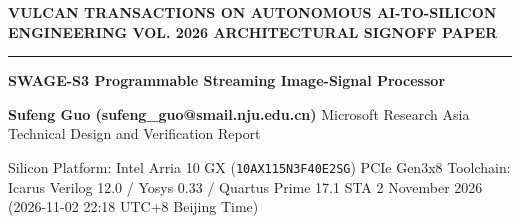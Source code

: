 \documentclass[11pt,a4paper]{article}
\begin{document}
{\scriptsize\sffamily\textcolor{vulcan}{\textbf{VULCAN TRANSACTIONS ON AUTONOMOUS AI-TO-SILICON ENGINEERING \hfill VOL. 2026 \textperiodcentered{} ARCHITECTURAL SIGNOFF PAPER}}\par}

\vspace{1pt}\textcolor{vulcan}{\rule{\textwidth}{1.2pt}}\vspace{4pt}

\begin{center}

{\sffamily\LARGE\bfseries SWAGE-S3 Programmable Streaming Image-Signal Processor\par}\vspace{3pt}

{\small\sffamily\textbf{Sufeng Guo (\allowbreak{}sufeng\_\allowbreak{}guo@smail.nju.edu.cn)\allowbreak{}} \textperiodcentered{} Microsoft Research Asia \textperiodcentered{} Technical Design and Verification Report\par}\vspace{1pt}

{\scriptsize\sffamily\textcolor{black!75}{Silicon Platform: Intel Arria 10 GX (\texttt{10AX115N3F40E2SG}) PCIe Gen3x8 \textperiodcentered{} Toolchain: Icarus Verilog 12.0 / Yosys 0.33 / Quartus Prime 17.1 STA \textperiodcentered{} 2 November 2026 (\allowbreak{}2026-11-02 22:18 UTC+\allowbreak{}8 Beijing Time)\allowbreak{}}\par}

\end{center}\vspace{2pt}
\end{document}
